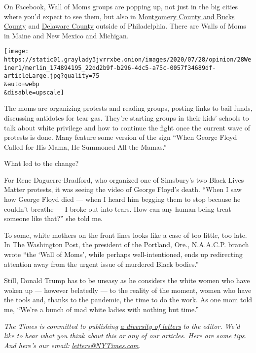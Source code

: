 On Facebook, Wall of Moms groups are popping up, not just in the big
cities where you'd expect to see them, but also in
\href{https://www.facebookcorewwwi.onion/groups/1170791863291062}{Montgomery
County and Bucks County} and
\href{https://www.facebookcorewwwi.onion/groups/3261681747203912}{Delaware
County} outside of Philadelphia. There are Walls of Moms in Maine and
New Mexico and Michigan.

\texttt{[image: https://static01.graylady3jvrrxbe.onion/images/2020/07/28/opinion/28Weiner1/merlin\_174894195\_22dd2b9f-b296-4dc5-a75c-0057f34689df-articleLarge.jpg?quality=75\\\&auto=webp\\\&disable=upscale]}

The moms are organizing protests and reading groups, posting links to
bail funds, discussing antidotes for tear gas. They're starting groups
in their kids' schools to talk about white privilege and how to continue
the fight once the current wave of protests is done. Many feature some
version of the sign ``When George Floyd Called for His Mama, He Summoned
All the Mamas.''

What led to the change?

For Rene Daguerre-Bradford, who organized one of Simsbury's two Black
Lives Matter protests, it was seeing the video of George Floyd's death.
``When I saw how George Floyd died --- when I heard him begging them to
stop because he couldn't breathe --- I broke out into tears. How can any
human being treat someone like that?'' she told me.

To some, white mothers on the front lines looks like a case of too
little, too late. In The Washington Post, the president of the Portland,
Ore., N.A.A.C.P. branch wrote ``the `Wall of Moms', while perhaps
well-intentioned, ends up redirecting attention away from the urgent
issue of murdered Black bodies.''

Still, Donald Trump has to be uneasy as he considers the white women who
have woken up --- however belatedly --- to the reality of the moment,
women who have the tools and, thanks to the pandemic, the time to do the
work. As one mom told me, ``We're a bunch of mad white ladies with
nothing but time.''

\emph{The Times is committed to publishing}
\href{https://www.nytimes3xbfgragh.onion/2019/01/31/opinion/letters/letters-to-editor-new-york-times-women.html}{\emph{a
diversity of letters}} \emph{to the editor. We'd like to hear what you
think about this or any of our articles. Here are some}
\href{https://help.nytimes3xbfgragh.onion/hc/en-us/articles/115014925288-How-to-submit-a-letter-to-the-editor}{\emph{tips}}\emph{.
And here's our email:}
\href{mailto:letters@NYTimes.com}{\emph{letters@NYTimes.com}}\emph{.}

